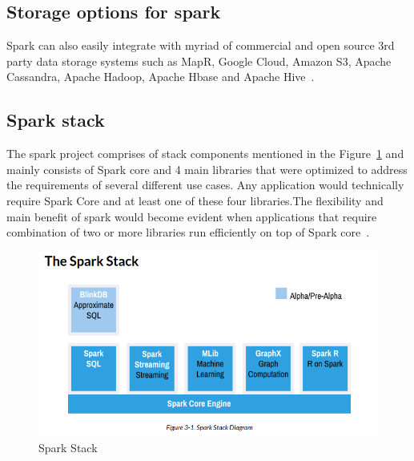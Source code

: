\subsection{Storage options for spark}

Spark can also easily integrate with myriad of commercial and open source 3rd 
party data storage systems such as MapR, Google Cloud, Amazon S3, Apache 
Cassandra, Apache Hadoop, Apache Hbase and Apache Hive~\cite{hid-sp18-410-spark-architecture}.


\subsection{Spark stack}


The spark project comprises of stack components mentioned in the 
Figure~\ref{fig:spark-stack} and mainly consists of Spark core and 
4 main libraries that were optimized to address the requirements 
of several different use cases.
Any application would technically require Spark Core and at least one of these 
four libraries.The flexibility and main benefit of spark would become evident 
when applications that require combination of two or more libraries run 
efficiently on top of Spark core~\cite{hid-sp18-410-spark-architecture}.





\begin{figure}[!ht]
  \centering\includegraphics[width=\columnwidth]{images/spark-stack.png}
   \caption{Spark Stack 
   ~\cite{hid-sp18-410-spark-architecture}}\label{fig:spark-stack}
\end{figure}




